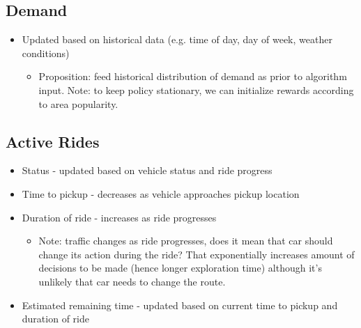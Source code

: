 \documentclass[12pt]{article}
\begin{document}
\subsection*{Demand}
\begin{itemize}
		\item Updated based on historical data (e.g. time of day, day of week, weather conditions)
				\begin{itemize}
						\item Proposition: feed historical distribution of demand as prior to algorithm
								input. Note: to keep policy stationary, we can initialize rewards according to
								area popularity.
				\end{itemize}
\end{itemize}
\subsection*{Active Rides}
\begin{itemize}
		\item Status - updated based on vehicle status and ride progress
		\item Time to pickup - decreases as vehicle approaches pickup location
		\item Duration of ride - increases as ride progresses
				\begin{itemize}
						\item Note: traffic changes as ride progresses, does it mean that car should change
								its action during the ride? That exponentially increases amount of decisions to
								be made (hence longer exploration time) although it's unlikely that car needs to
								change the route.
				\end{itemize}
		\item Estimated remaining time - updated based on current time to pickup and duration of ride
\end{itemize}
\end{document}
